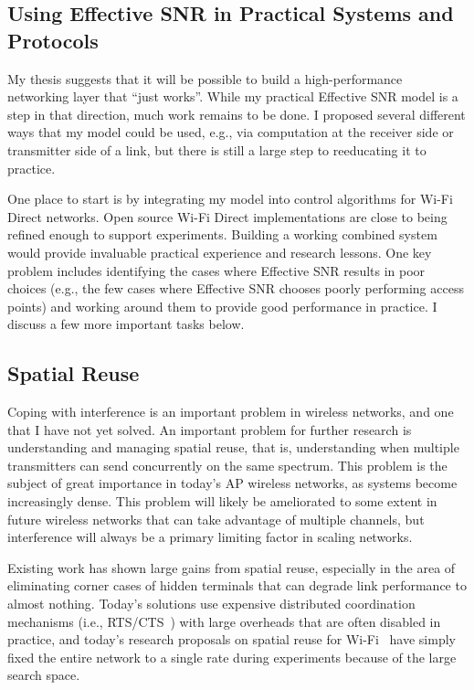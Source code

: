 \subsection{Using Effective SNR in Practical Systems and Protocols}
My thesis suggests that it will be possible to build a high-performance networking layer that ``just works''. While my practical Effective SNR model is a step in that direction, much work remains to be done. I proposed several different ways that my model could be used, e.g., via computation at the receiver side or transmitter side of a link, but there is still a large step to reeducating it to practice.

One place to start is by integrating my model into control algorithms for Wi-Fi Direct networks. Open source Wi-Fi Direct implementations are close to being refined enough to support experiments. Building a working combined system would provide invaluable practical experience and research lessons. One key problem includes identifying the cases where Effective SNR results in poor choices (e.g., the few cases where Effective SNR chooses poorly performing access points) and working around them to provide good performance in practice. I discuss a few more important tasks below.

\subsection{Spatial Reuse}
Coping with interference is an important problem in wireless networks, and one that I have not yet solved. An important problem for further research is understanding and managing spatial reuse, that is, understanding when multiple transmitters can send concurrently on the same spectrum. This problem is the subject of great importance in today's AP wireless networks, as systems become increasingly dense. This problem will likely be ameliorated to some extent in future wireless networks that can take advantage of multiple channels, but interference will always be a primary limiting factor in scaling networks.

Existing work has shown large gains from spatial reuse, especially in the area of eliminating corner cases of hidden terminals that can degrade link performance to almost nothing. Today's solutions use expensive distributed coordination mechanisms (i.e., RTS/CTS~\cite{Karn_MACA}) with large overheads that are often disabled in practice, and today's research proposals on spatial reuse for Wi-Fi~\cite{Shrivastava_CENTAUR,Vutukuru_CMAP} have simply fixed the entire network to a single rate during experiments because of the large search space.

